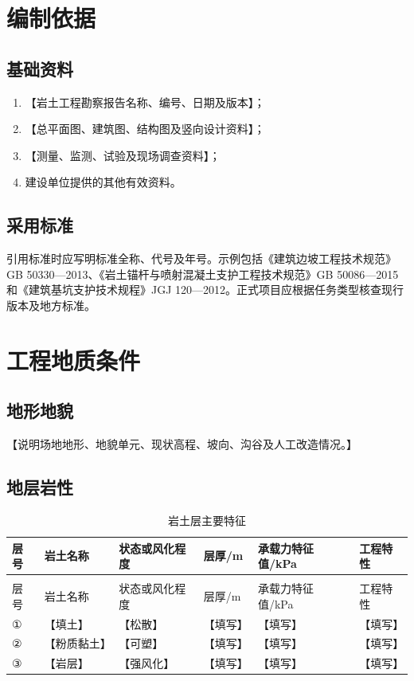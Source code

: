 \documentclass[UTF8,zihao=-4,oneside]{ctexrep}
\renewcommand{\thetable}{\thechapter-\arabic{table}}
\newcommand{\placeholder}[1]{\textcolor{documentblack}{【#1】}}
\begin{document}
\chapter{编制依据}

\section{基础资料}
\begin{enumerate}
  \item \placeholder{岩土工程勘察报告名称、编号、日期及版本}；
  \item \placeholder{总平面图、建筑图、结构图及竖向设计资料}；
  \item \placeholder{测量、监测、试验及现场调查资料}；
  \item 建设单位提供的其他有效资料。
\end{enumerate}

\section{采用标准}
引用标准时应写明标准全称、代号及年号。示例包括《建筑边坡工程技术规范》GB 50330—2013\cite{gb50330}、《岩土锚杆与喷射混凝土支护工程技术规范》GB 50086—2015\cite{gb50086}和《建筑基坑支护技术规程》JGJ 120—2012\cite{jgj120}。正式项目应根据任务类型核查现行版本及地方标准。

\chapter{工程地质条件}

\section{地形地貌}
\placeholder{说明场地地形、地貌单元、现状高程、坡向、沟谷及人工改造情况。}

\section{地层岩性}
\begin{longtable}{>{\centering\arraybackslash}p{16mm}p{30mm}p{24mm}p{22mm}p{22mm}p{28mm}}
  \caption{岩土层主要特征}\label{tab:strata}\\
  \toprule
  层号 & 岩土名称 & 状态或风化程度 & 层厚/m & 承载力特征值/kPa & 工程特性 \\
  \midrule
  \endfirsthead
  \multicolumn{6}{l}{续表~\thetable}\\
  \toprule
  层号 & 岩土名称 & 状态或风化程度 & 层厚/m & 承载力特征值/kPa & 工程特性 \\
  \midrule
  \endhead
  \bottomrule
  \endfoot
  ① & \placeholder{填土} & \placeholder{松散} & \placeholder{填写} & \placeholder{填写} & \placeholder{填写} \\
  ② & \placeholder{粉质黏土} & \placeholder{可塑} & \placeholder{填写} & \placeholder{填写} & \placeholder{填写} \\
  ③ & \placeholder{岩层} & \placeholder{强风化} & \placeholder{填写} & \placeholder{填写} & \placeholder{填写} \\
\end{longtable}
\end{document}
